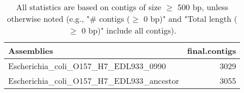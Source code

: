 \documentclass[12pt,a4paper]{article}
\begin{document}
\begin{table}[ht]
\begin{center}
\caption{All statistics are based on contigs of size $\geq$ 500 bp, unless otherwise noted (e.g., "\# contigs ($\geq$ 0 bp)" and "Total length ($\geq$ 0 bp)" include all contigs).}
\begin{tabular}{|l*{1}{|r}|}
\hline
Assemblies & final.contigs \\ \hline
Escherichia\_coli\_O157\_H7\_EDL933\_0990 & 3029 \\ \hline
Escherichia\_coli\_O157\_H7\_EDL933\_ancestor & 3055 \\ \hline
\end{tabular}
\end{center}
\end{table}
\end{document}
